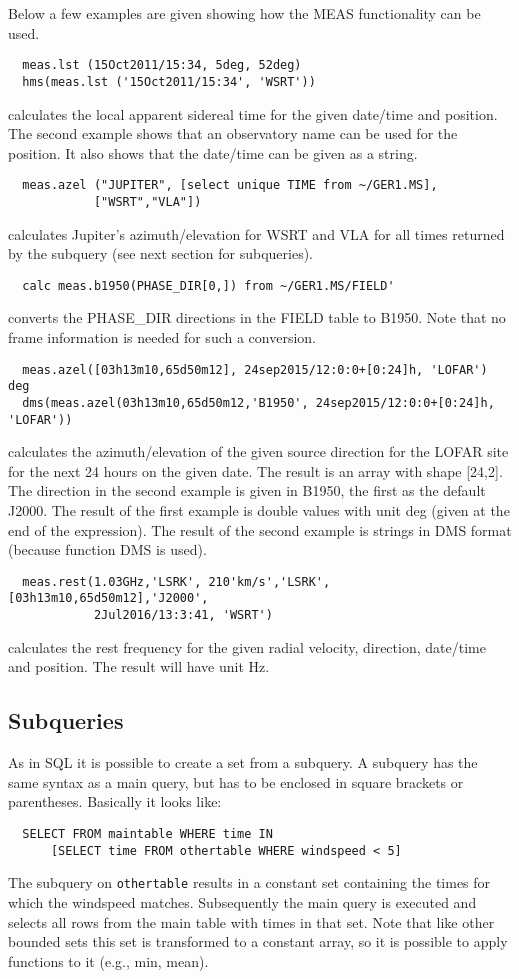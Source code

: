Below a few examples are given showing how the MEAS functionality can
be used.
\begin{verbatim}
  meas.lst (15Oct2011/15:34, 5deg, 52deg)
  hms(meas.lst ('15Oct2011/15:34', 'WSRT'))
\end{verbatim}
calculates the local apparent sidereal time for the given date/time and
position. The second example shows that an observatory name can be
used for the position. It also shows that the date/time can be given
as a string.
\begin{verbatim}
  meas.azel ("JUPITER", [select unique TIME from ~/GER1.MS],
            ["WSRT","VLA"])
\end{verbatim}
calculates Jupiter's azimuth/elevation for WSRT and VLA for all
times returned by the subquery (see next section for subqueries).
\begin{verbatim}
  calc meas.b1950(PHASE_DIR[0,]) from ~/GER1.MS/FIELD'
\end{verbatim}
converts the PHASE\_DIR directions in the FIELD table to B1950. Note
that no frame information is needed for such a conversion.
\begin{verbatim}
  meas.azel([03h13m10,65d50m12], 24sep2015/12:0:0+[0:24]h, 'LOFAR') deg
  dms(meas.azel(03h13m10,65d50m12,'B1950', 24sep2015/12:0:0+[0:24]h, 'LOFAR'))
\end{verbatim}
calculates the azimuth/elevation of the given source direction for
the LOFAR site for the next 24 hours on the given date. The result is an array with shape [24,2].
The direction in the second example is given in B1950, the first as the
default J2000.
The result of the first example is double values with unit deg (given
at the end of the expression). The result of the second example is
strings in DMS format (because function DMS is used).
\begin{verbatim}
  meas.rest(1.03GHz,'LSRK', 210'km/s','LSRK', [03h13m10,65d50m12],'J2000',
            2Jul2016/13:3:41, 'WSRT')
\end{verbatim}
calculates the rest frequency for the given radial velocity,
direction, date/time and position. The result will have unit Hz.


\subsection{\label{TAQL:SUBQUERIES}Subqueries}
As in SQL it is possible to create a set from a subquery. A
subquery has the same syntax as a main query, but has to be
enclosed in square brackets or parentheses. Basically it looks like:
\begin{verbatim}
  SELECT FROM maintable WHERE time IN
      [SELECT time FROM othertable WHERE windspeed < 5]
\end{verbatim}
The subquery on \texttt{othertable} results in a constant set
containing the times
for which the windspeed matches. Subsequently the main query
is executed and selects all rows from the main table with times in
that set.
Note that like other bounded sets this set is transformed to a
constant array, so it is possible to apply functions to it (e.g., min,
mean).

